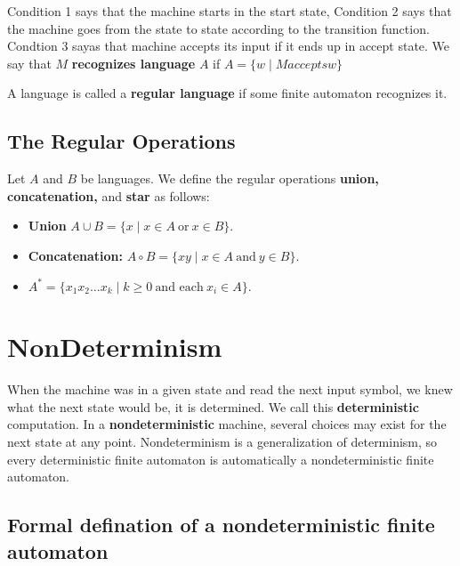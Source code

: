 Condition 1 says that the machine starts in the start state, Condition 2
says that the machine goes from the state to state according to the transition
function. Condtion 3 sayas that machine accepts its input if it ends up in
accept state. We say that $M$ \textbf{recognizes language} $A$ if
$A = \{w \mid M accepts w\}$

\begin{defination}
    A language is called a \textbf{regular language} if some finite automaton
    recognizes it.
\end{defination}

\subsection{The Regular Operations}

\begin{defination}
    Let $A$ and $B$ be languages. We define the regular operations
    \textbf{union, concatenation,} and \textbf{star} as follows:
    \begin{itemize}
        \item \textbf{Union} $A \cup B = \{x \mid x \in
            A\ \text{or}\ x \in B\}$.
        \item \textbf{Concatenation:} $A \circ B = \{xy \mid x \in
            A\ \text{and}\ y \in B\}$.
        \item $A^{*} = \{x_1x_2\dots x_k \mid k \ge 0\ \text{and each}\ x_i
            \in A\}$.
    \end{itemize}
\end{defination}

\section{NonDeterminism}

When the machine was in a given state and read the next input symbol, we knew
what the next state would be, it is determined. We call this
\textbf{deterministic} computation. In a \textbf{nondeterministic} machine,
several choices may exist for the next state at any point. Nondeterminism is
a generalization of determinism, so every deterministic finite automaton is
automatically a nondeterministic finite automaton.

\subsection{Formal defination of a nondeterministic finite automaton}

